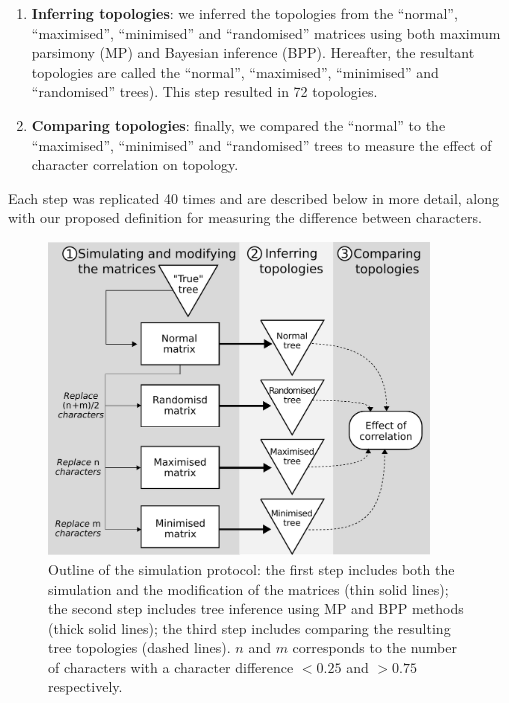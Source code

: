 \documentclass[12pt,letterpaper]{article}
\begin{document}
\begin{enumerate}
\item \textbf{Inferring topologies}: we inferred the topologies from the ``normal'', ``maximised'', ``minimised'' and ``randomised'' matrices using both maximum parsimony  (MP) and Bayesian inference (BPP). 
Hereafter, the resultant topologies are called the ``normal'', ``maximised'', ``minimised'' and ``randomised'' trees). This step resulted in 72 topologies.
    \item \textbf{Comparing topologies}: finally, we compared the ``normal'' to the ``maximised'', ``minimised'' and ``randomised'' trees to measure the effect of character correlation on topology.
\end{enumerate}
Each step was replicated 40 times and are described below in more detail, along with our proposed definition for measuring the difference between characters.

\begin{figure}[!htbp]
\centering
   \includegraphics[width=0.9\textwidth]{Figures/outline.pdf}
\caption{Outline of the simulation protocol: the first step includes both the simulation and the modification of the matrices (thin solid lines); the second step includes tree inference using MP and BPP methods (thick solid lines); the third step includes comparing the resulting tree topologies (dashed lines). $n$ and $m$ corresponds to the number of characters with a character difference $<0.25$ and $>0.75$ respectively.}
\label{Fig:outline}
\end{figure}
\end{document}
